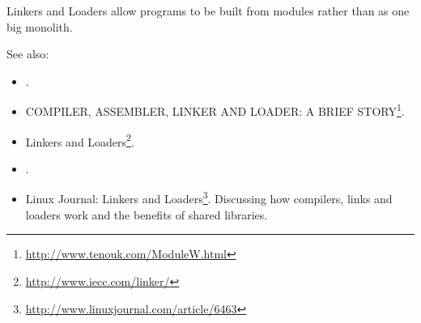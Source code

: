 Linkers and Loaders allow programs to be built from modules rather than as one big
monolith.

See also:
\begin{itemize}
\item {}.
\item COMPILER, ASSEMBLER, LINKER AND LOADER: A BRIEF
  STORY\footnote{\url{http://www.tenouk.com/ModuleW.html}}.
\item Linkers and Loaders\footnote{\url{http://www.iecc.com/linker/}}.
\item {}.
\item Linux Journal: Linkers and
  Loaders\footnote{\url{http://www.linuxjournal.com/article/6463}}. Discussing how
  compilers, links and loaders work and the benefits of shared libraries.
\end{itemize}

